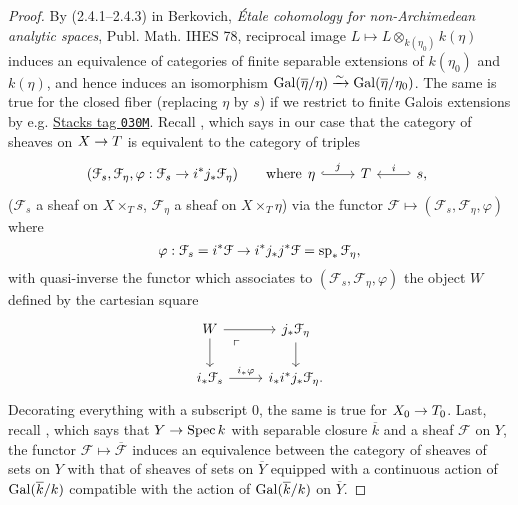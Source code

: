 \documentclass[deligne.tex]{subfiles}
\begin{document}
\begin{proof}\label{pf:berkovich_lemma}
By (2.4.1–2.4.3) in  Berkovich,
\emph{Étale cohomology for non-Archimedean analytic spaces},
Publ. Math. IHES 78,
reciprocal image $L\mapsto L\otimes_{k(\eta_0)}k(\eta)$ induces an
equivalence of categories of finite separable extensions of $k(\eta_0)$ and
$k(\eta)$, and hence induces an isomorphism
$\operatorname{Gal}(\overline\eta/\eta)\xrightarrow\sim\operatorname{Gal}(\overline\eta/\eta_0)$.
The same is true for the closed fiber (replacing $\eta$ by $s$) if we
restrict to finite Galois extensions by e.g.
\href{https://stacks.math.columbia.edu/tag/030M}{Stacks tag \texttt{030M}}.
Recall \cite[IV 9.5.4]{SGAA}, which says in our case that the category of 
sheaves on $X\rightarrow T$ is equivalent to the category of triples
\begin{equation*}
	(\mathcal F_s,\mathcal F_\eta,\varphi:\mathcal F_s\ra i^*j_*\mathcal F_\eta)
	\qquad\text{where}
\begin{tikzcd}\eta\arrow[r,hook,"j"]&T&s,\arrow[l,hook',"i"']\end{tikzcd}
\end{equation*}
($\mathcal F_s$ a sheaf on $X\times_T s$,
$\mathcal F_\eta$ a sheaf on $X\times_T \eta$)
via the functor $\mathcal F\mapsto(\mathcal F_s,\mathcal F_\eta,\varphi)$
where
\begin{equation*}
	\varphi:\mathcal F_s=i^*\mathcal F\rightarrow i^*j_*j^*\mathcal F
	=\operatorname{sp}_*\mathcal F_\eta,
\end{equation*}
with quasi-inverse the functor which associates to 
$(\mathcal F_s,\mathcal F_\eta,\varphi)$ the object $W$ defined by the
cartesian square
\begin{equation*}\begin{tikzcd}
	W\arrow[d]\arrow[r]\arrow[dr,phantom,"\ulcorner" near start]&j_*\mathcal F_\eta\arrow[d] \\
	i_*\mathcal F_s\arrow[r,"i_*\varphi"]&i_*i^*j_*\mathcal F_\eta.
\end{tikzcd}\end{equation*}
Decorating everything with a subscript 0, the same is true for
$X_0\rightarrow T_0$.
Last, recall \cite[XIII 1.3.3 (ii)]{SGA7}, which says that $Y\rightarrow\operatorname{Spec} k$
with separable closure $\overline k$ and a sheaf $\mathcal F$ on $Y$,
the functor $\mathcal F\mapsto\overline{\mathcal F}$ induces an equivalence
between the category of sheaves of sets on $Y$ with that of sheaves of sets
on $\overline Y$ equipped with a continuous action of $\operatorname{Gal}(\overline k/k)$
compatible with the action of $\operatorname{Gal}(\overline k/k)$ on $\overline Y$.
\end{proof}
\end{document}
